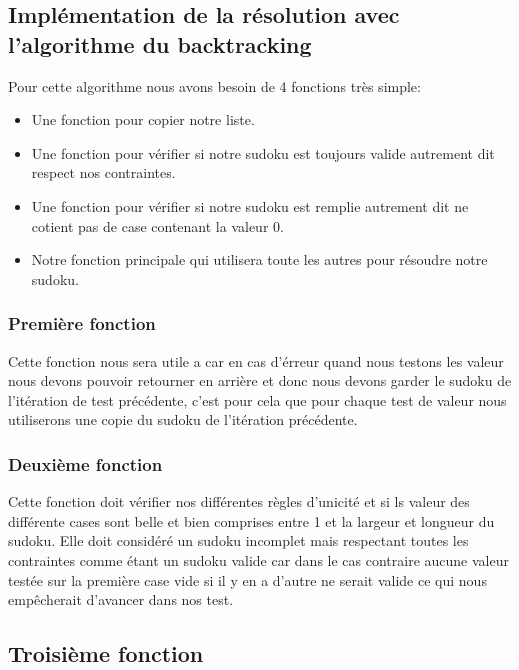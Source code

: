 \subsection{Implémentation de la résolution avec l'algorithme du backtracking}

Pour cette algorithme nous avons besoin de 4 fonctions très simple:

\begin{itemize}
  \item Une fonction pour copier notre liste.
  \item Une fonction pour vérifier si notre sudoku est toujours valide autrement dit respect nos contraintes.
  \item Une fonction pour vérifier si notre sudoku est remplie autrement dit ne cotient pas de case contenant la valeur 0.
  \item Notre fonction principale qui utilisera toute les autres pour résoudre notre sudoku.
\end{itemize}

\subsubsection{Première fonction}

Cette fonction nous sera utile a car en cas d'érreur quand nous testons les valeur nous devons pouvoir retourner en arrière et donc nous devons garder le sudoku de l'itération de test précédente, c'est pour cela que pour chaque test de valeur nous utiliserons une copie du sudoku de l'itération précédente.\newline

\subsubsection{Deuxième fonction}

Cette fonction doit vérifier nos différentes règles d'unicité et si ls valeur des différente cases sont belle et bien comprises entre 1 et la largeur et longueur du sudoku. Elle doit considéré un sudoku incomplet mais respectant toutes les contraintes comme étant un sudoku valide car dans le cas contraire aucune valeur testée sur la première case vide si il y en a d'autre ne serait valide ce qui nous empêcherait d'avancer dans nos test.\newline

\subsection{Troisième fonction}

